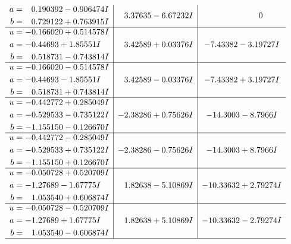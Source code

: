 \documentclass[1p]{elsarticle_modified}
\theoremstyle{definition}
\begin{document}
$$\begin{array}{c|c|c}
\begin{aligned}
a &= \phantom{-}0.190392 - 0.906474 I \\
b &= \phantom{-}0.729122 + 0.763915 I\end{aligned}
 & \phantom{-}3.37635 - 6.67232 I & \phantom{-0.000000 } 0 \\ \hline\begin{aligned}
u &= -0.166020 + 0.514578 I \\
a &= -0.44693 + 1.85551 I \\
b &= \phantom{-}0.518731 - 0.743814 I\end{aligned}
 & \phantom{-}3.42589 + 0.03376 I & -7.43382 - 3.19727 I \\ \hline\begin{aligned}
u &= -0.166020 - 0.514578 I \\
a &= -0.44693 - 1.85551 I \\
b &= \phantom{-}0.518731 + 0.743814 I\end{aligned}
 & \phantom{-}3.42589 - 0.03376 I & -7.43382 + 3.19727 I \\ \hline\begin{aligned}
u &= -0.442772 + 0.285049 I \\
a &= -0.529533 - 0.735122 I \\
b &= -1.155150 - 0.126670 I\end{aligned}
 & -2.38286 + 0.75626 I & -14.3003 - 8.7966 I \\ \hline\begin{aligned}
u &= -0.442772 - 0.285049 I \\
a &= -0.529533 + 0.735122 I \\
b &= -1.155150 + 0.126670 I\end{aligned}
 & -2.38286 - 0.75626 I & -14.3003 + 8.7966 I \\ \hline\begin{aligned}
u &= -0.050728 + 0.520709 I \\
a &= -1.27689 - 1.67775 I \\
b &= \phantom{-}1.053540 + 0.606874 I\end{aligned}
 & \phantom{-}1.82638 - 5.10869 I & -10.33632 + 2.79274 I \\ \hline\begin{aligned}
u &= -0.050728 - 0.520709 I \\
a &= -1.27689 + 1.67775 I \\
b &= \phantom{-}1.053540 - 0.606874 I\end{aligned}
 & \phantom{-}1.82638 + 5.10869 I & -10.33632 - 2.79274 I\\
 \hline 

\end{array}$$
\end{document}
